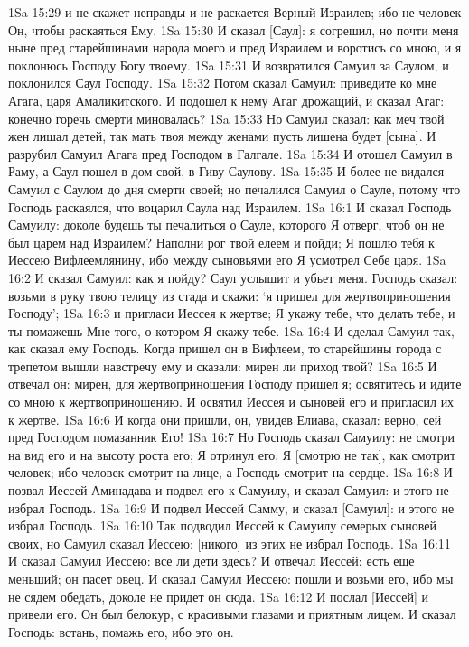 1Sa 15:29  и не скажет неправды и не раскается Верный Израилев; ибо не человек Он, чтобы раскаяться Ему.
1Sa 15:30  И сказал [Саул]: я согрешил, но почти меня ныне пред старейшинами народа моего и пред Израилем и воротись со мною, и я поклонюсь Господу Богу твоему.
1Sa 15:31  И возвратился Самуил за Саулом, и поклонился Саул Господу.
1Sa 15:32  Потом сказал Самуил: приведите ко мне Агага, царя Амаликитского. И подошел к нему Агаг дрожащий, и сказал Агаг: конечно горечь смерти миновалась?
1Sa 15:33  Но Самуил сказал: как меч твой жен лишал детей, так мать твоя между женами пусть лишена будет [сына]. И разрубил Самуил Агага пред Господом в Галгале.
1Sa 15:34  И отошел Самуил в Раму, а Саул пошел в дом свой, в Гиву Саулову.
1Sa 15:35  И более не видался Самуил с Саулом до дня смерти своей; но печалился Самуил о Сауле, потому что Господь раскаялся, что воцарил Саула над Израилем.
1Sa 16:1  И сказал Господь Самуилу: доколе будешь ты печалиться о Сауле, которого Я отверг, чтоб он не был царем над Израилем? Наполни рог твой елеем и пойди; Я пошлю тебя к Иессею Вифлеемлянину, ибо между сыновьями его Я усмотрел Себе царя.
1Sa 16:2  И сказал Самуил: как я пойду? Саул услышит и убьет меня. Господь сказал: возьми в руку твою телицу из стада и скажи: `я пришел для жертвоприношения Господу';
1Sa 16:3  и пригласи Иессея к жертве; Я укажу тебе, что делать тебе, и ты помажешь Мне того, о котором Я скажу тебе.
1Sa 16:4  И сделал Самуил так, как сказал ему Господь. Когда пришел он в Вифлеем, то старейшины города с трепетом вышли навстречу ему и сказали: мирен ли приход твой?
1Sa 16:5  И отвечал он: мирен, для жертвоприношения Господу пришел я; освятитесь и идите со мною к жертвоприношению. И освятил Иессея и сыновей его и пригласил их к жертве.
1Sa 16:6  И когда они пришли, он, увидев Елиава, сказал: верно, сей пред Господом помазанник Его!
1Sa 16:7  Но Господь сказал Самуилу: не смотри на вид его и на высоту роста его; Я отринул его; Я [смотрю не так], как смотрит человек; ибо человек смотрит на лице, а Господь смотрит на сердце.
1Sa 16:8  И позвал Иессей Аминадава и подвел его к Самуилу, и сказал Самуил: и этого не избрал Господь.
1Sa 16:9  И подвел Иессей Самму, и сказал [Самуил]: и этого не избрал Господь.
1Sa 16:10  Так подводил Иессей к Самуилу семерых сыновей своих, но Самуил сказал Иессею: [никого] из этих не избрал Господь.
1Sa 16:11  И сказал Самуил Иессею: все ли дети здесь? И отвечал Иессей: есть еще меньший; он пасет овец. И сказал Самуил Иессею: пошли и возьми его, ибо мы не сядем обедать, доколе не придет он сюда.
1Sa 16:12  И послал [Иессей] и привели его. Он был белокур, с красивыми глазами и приятным лицем. И сказал Господь: встань, помажь его, ибо это он.

